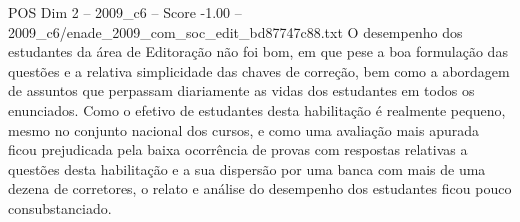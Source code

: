 \begin{textsample}{POS Dim 2 – 2009\_c6 – Score -1.00 – 2009\_c6/enade\_2009\_com\_soc\_edit\_bd87747c88.txt}
O desempenho dos estudantes da área de Editoração não foi bom, em que pese a boa formulação das questões e a relativa simplicidade das chaves de correção, bem como a abordagem de assuntos que perpassam diariamente as vidas dos estudantes em todos os enunciados.
Como o efetivo de estudantes desta habilitação é realmente pequeno, mesmo no conjunto nacional dos cursos, e como uma avaliação mais apurada ficou prejudicada pela baixa ocorrência de provas com respostas relativas a questões desta habilitação e a sua dispersão por uma banca com mais de uma dezena de corretores, o relato e análise do desempenho dos estudantes ficou pouco consubstanciado.

\end{textsample}
